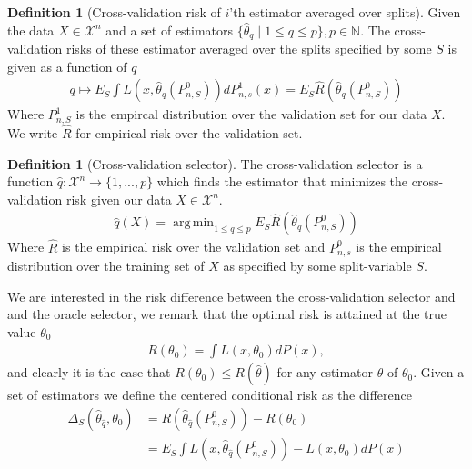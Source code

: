\documentclass[11pt, a4paper]{article}
\DeclareMathOperator*{\argmin}{arg\,min}
\theoremstyle{definition}
\newtheorem{definition}[theorem]{Definition}
\theoremstyle{remark}
\newcommand{\cl}{q}
\begin{document}
\begin{definition}[Cross-validation risk of $ i $'th estimator averaged over splits]
    Given the data $ X \in \mathcal{X}^{n} $ and a set of estimators $ \{ \hat{\theta}_{\cl} \mid 1 \leq \cl \leq p \}, p \in \mathbb{N} $. The cross-validation risks of these estimator averaged over the splits specified by some $ S $ is given as a function of $ \cl $ 
    \begin{align*}
        \cl \mapsto E_S \int L(x, \hat{\theta}_{\cl}(P_{n,S}^{0}) ) dP_{n, s}^{1}(x) = E_S \hat{R}( \hat{\theta}_\cl(P_{n,S}^{0})) 
    \end{align*}
    Where $ P_{n,S}^{1} $ is the empircal distribution over the validation set for our data $ X $. We write $ \hat{R} $ for empirical risk over the validation set. 
\end{definition}

\begin{definition}[Cross-validation selector]
    The cross-validation selector is a function $ \hat{\cl}: \mathcal{X}^{n} \to \{1,...,p\} $  which finds the estimator that minimizes the cross-validation risk given our data $ X \in \mathcal{X}^{n} $. 
    \begin{align*}
        \hat{\cl}(X) = \argmin_{1 \leq \cl \leq p} E_S \hat{R} ( \hat{\theta} _\cl (P_{n,S}^0 )) 
    \end{align*}
    Where $ \hat{R}  $ is the empirical risk over the validation set and $ P_{n ,s}^{0} $ is the empirical distribution over the training set of $ X $ as specified by some split-variable $ S $. 
\end{definition}
We are interested in the risk difference between the cross-validation selector and and the oracle selector, we remark that the optimal risk is attained at the true value $ \theta_0 $ 
\begin{align*}
    R(\theta_0) = \int L(x, \theta_0)  dP(x),
\end{align*}
and clearly it is the case that $ R(\theta_0) \leq R( \hat{\theta}  ) $ for any estimator $ \hat{\theta} $ of $ \theta_0 $.
Given a set of estimators we define the centered conditional risk as the difference 
\begin{align*}
    \Delta_{S}( \hat{\theta}_{ \hat{\cl} }, \theta_0 ) &= R( \hat{\theta} _{ \hat{\cl} }(P_{n, S}^{0})) -R(\theta_0) \\
                                                       &= E_{S} \int L(x, \hat{\theta}_{ \hat{\cl} }(P_{n, S}^{0})) - L(x, \theta_0) dP(x) 
\end{align*}
\end{document}
